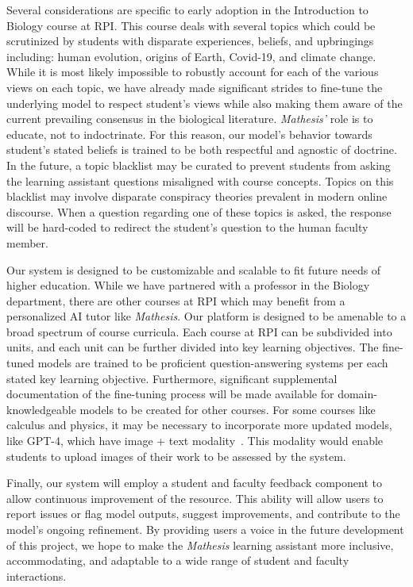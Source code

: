 \documentclass[12pt,a4paper]{article}
\begin{document}
    Several considerations are specific to early adoption in the Introduction to Biology course at RPI.
    This course deals with several topics which could be scrutinized by students with disparate
    experiences, beliefs, and upbringings including: human evolution, origins of Earth, Covid-19,
    and climate change. While it is most likely impossible to robustly account for each of the various
    views on each topic, we have already made significant strides to fine-tune the underlying model
    to respect student’s views while also making them aware of the current prevailing consensus in
    the biological literature. \textit{Mathesis'} role is to educate, not to indoctrinate. For this reason,
    our model's behavior towards student's stated beliefs is trained to be both respectful and
    agnostic of doctrine. In the future, a topic blacklist may be curated to prevent students from
    asking the learning assistant questions misaligned with course concepts. Topics on this blacklist
    may involve disparate conspiracy theories prevalent in modern online discourse. When a question
    regarding one of these topics is asked, the response will be hard-coded to redirect the student's
    question to the human faculty member.

    Our system is designed to be customizable and scalable to fit future needs of higher education.
    While we have partnered with a professor in the Biology department, there are other courses at
    RPI which may benefit from a personalized AI tutor like \textit{Mathesis}. Our platform is
    designed to be amenable to a broad spectrum of course curricula. Each course at RPI can be
    subdivided into units, and each unit can be further divided into key learning objectives. The
    fine-tuned models are trained to be proficient question-answering systems per each stated key
    learning objective. Furthermore, significant supplemental documentation of the fine-tuning
    process will be made available for domain-knowledgeable models to be created for other courses.
    For some courses like calculus and physics, it may be necessary to incorporate more updated
    models, like GPT-4, which have image + text modality~\cite{openAiDocs,gpt4}. This modality would
    enable students to upload images of their work to be assessed by the system.

    Finally, our system will employ a student and faculty feedback component to allow continuous
    improvement of the resource. This ability will allow users to report issues or flag model outputs,
    suggest improvements, and contribute to the model's ongoing refinement. By providing users a
    voice in the future development of this project, we hope to make the \textit{Mathesis} learning assistant
    more inclusive, accommodating, and adaptable to a wide range of student and faculty interactions.
\end{document}
